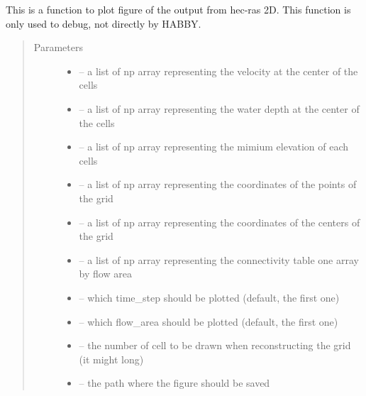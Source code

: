 \documentclass[letterpaper,10pt,english]{sphinxmanual}
\begin{document}
\begin{fulllineitems}
\label{\detokenize{index:src.hec_ras2D.figure_hec_ras2d}}
This is a function to plot figure of the output from hec-ras 2D. This function is only used to debug, not directly by HABBY.
\begin{quote}\begin{description}
\item[{Parameters}] \leavevmode\begin{itemize}
\item {} 
 -- a list of np array representing the velocity at the center of the cells

\item {} 
 -- a list of np array representing the water depth at the center of the cells

\item {} 
 -- a list of np array representing the mimium elevation of each cells

\item {} 
 -- a list of np array representing the coordinates of the points of the grid

\item {} 
 -- a list of np array representing the coordinates of the centers of the grid

\item {} 
 -- a list of np array representing the connectivity table
one array by flow area

\item {} 
 -- which time\_step should be plotted (default, the first one)

\item {} 
 -- which flow\_area should be plotted (default, the first one)

\item {} 
 -- the number of cell to be drawn when reconstructing the grid (it might long)

\item {} 
 -- the path where the figure should be saved


\end{itemize}
\end{description}
\end{quote}
\end{fulllineitems}
\end{document}
